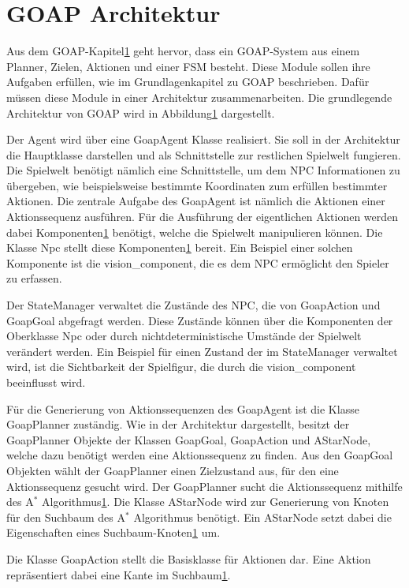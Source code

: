 \section{GOAP Architektur}

Aus dem GOAP-Kapitel\ref{} geht hervor, dass ein GOAP-System aus einem Planner, Zielen, Aktionen und einer FSM besteht. Diese Module sollen ihre Aufgaben erfüllen, wie im Grundlagenkapitel zu GOAP beschrieben. Dafür müssen diese Module in einer Architektur zusammenarbeiten. Die grundlegende Architektur von GOAP wird in Abbildung\ref{} dargestellt.

Der Agent wird über eine GoapAgent Klasse realisiert. Sie soll in der Architektur die Hauptklasse darstellen und als Schnittstelle zur restlichen Spielwelt fungieren. Die Spielwelt benötigt nämlich eine Schnittstelle, um dem NPC Informationen zu übergeben, wie beispielsweise bestimmte Koordinaten zum erfüllen bestimmter Aktionen. Die zentrale Aufgabe des GoapAgent ist nämlich die Aktionen einer Aktionssequenz ausführen. Für die Ausführung der eigentlichen Aktionen werden dabei Komponenten\ref{} benötigt, welche die Spielwelt manipulieren können. Die Klasse Npc stellt diese Komponenten\ref{} bereit. Ein Beispiel einer solchen Komponente ist die vision\_component, die es dem NPC ermöglicht den Spieler zu erfassen.

Der StateManager verwaltet die Zustände des NPC, die von GoapAction und GoapGoal abgefragt werden. Diese Zustände können über die Komponenten der Oberklasse Npc oder durch nichtdeterministische Umstände der Spielwelt verändert werden. Ein Beispiel für einen Zustand der im StateManager verwaltet wird, ist die Sichtbarkeit der Spielfigur, die durch die vision\_component beeinflusst wird.

Für die Generierung von Aktionssequenzen des GoapAgent ist die Klasse GoapPlanner zuständig. Wie in der Architektur dargestellt, besitzt der GoapPlanner Objekte der Klassen GoapGoal, GoapAction und AStarNode, welche dazu benötigt werden eine Aktionssequenz zu finden. Aus den GoapGoal Objekten wählt der GoapPlanner einen Zielzustand aus, für den eine Aktionssequenz gesucht wird. Der GoapPlanner sucht die Aktionssequenz mithilfe des A$^*$ Algorithmus\ref{}. Die Klasse AStarNode wird zur Generierung von Knoten für den Suchbaum des A$^*$ Algorithmus benötigt. Ein AStarNode setzt dabei die Eigenschaften eines Suchbaum-Knoten\ref{} um.

Die Klasse GoapAction stellt die Basisklasse für Aktionen dar. Eine Aktion repräsentiert dabei eine Kante im Suchbaum\ref{}.


